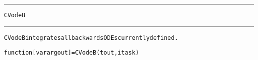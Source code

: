 \begin{samepage}
\hrule
\begin{center}
{\large \verb!CVodeB!}
\label{p:CVodeB}
\end{center}
\hrule\vspace{0.1in}



\begin{alltt}
CVodeB integrates all backwards ODEs currently defined.
\end{alltt}

\end{samepage}



\begin{samepage}


\begin{alltt}
function [varargout] = CVodeB(tout,itask) 
\end{alltt}

\end{samepage}



